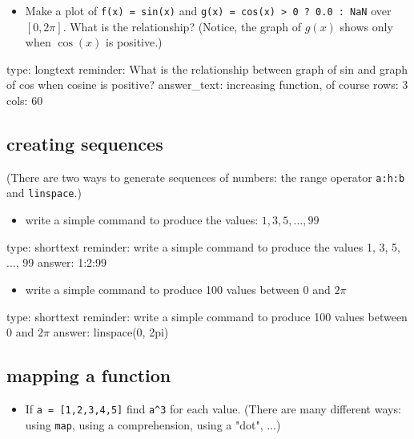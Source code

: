 \documentclass[12pt]{article}
\begin{document}
\begin{itemize}
\itemsep1pt\parskip0pt
\item
  Make a plot of \texttt{f(x) = sin(x)} and
  \texttt{g(x) = cos(x) \textgreater{} 0 ? 0.0 : NaN} over $[0, 2\pi]$.
  What is the relationship? (Notice, the graph of $g(x)$ shows only when
  $\cos(x)$ is positive.)
\end{itemize}

\begin{answer}
type: longtext
reminder: What is the relationship between graph of sin and graph of cos when cosine is positive?
answer_text: increasing function, of course 
rows: 3
cols: 60
\end{answer}

\subsection{creating sequences}

(There are two ways to generate sequences of numbers: the range operator
\texttt{a:h:b} and \texttt{linspace}.)

\begin{itemize}
\itemsep1pt\parskip0pt
\item
  write a simple command to produce the values: $1, 3, 5, \dots, 99$
\end{itemize}

\begin{answer}
type: shorttext
reminder: write a simple command to produce the values 1, 3, 5, ..., 99
answer: 1:2:99

\end{answer}

\begin{itemize}
\itemsep1pt\parskip0pt
\item
  write a simple command to produce 100 values between $0$ and $2\pi$
\end{itemize}

\begin{answer}
type: shorttext
reminder: write a simple command to produce  100 values between 0 and \(2\pi\)
answer: linspace(0, 2pi)

\end{answer}

\subsection{mapping a function}

\begin{itemize}
\itemsep1pt\parskip0pt
\item
  If \texttt{a = {[}1,2,3,4,5{]}} find \texttt{a\^{}3} for each value.
  (There are many different ways: using \texttt{map}, using a
  comprehension, using a "dot", ...)
\end{itemize}
\end{document}
